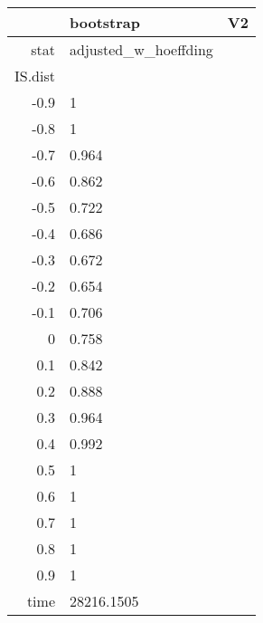 \begin{table}[ht]
\centering
\begingroup\tiny
\begin{tabular}{rll}
  \hline
 & bootstrap & V2 \\ 
  \hline
stat & adjusted\_w\_hoeffding &  \\ 
  IS.dist &  &  \\ 
  -0.9 & 1 &  \\ 
  -0.8 & 1 &  \\ 
  -0.7 & 0.964 &  \\ 
  -0.6 & 0.862 &  \\ 
  -0.5 & 0.722 &  \\ 
  -0.4 & 0.686 &  \\ 
  -0.3 & 0.672 &  \\ 
  -0.2 & 0.654 &  \\ 
  -0.1 & 0.706 &  \\ 
  0 & 0.758 &  \\ 
  0.1 & 0.842 &  \\ 
  0.2 & 0.888 &  \\ 
  0.3 & 0.964 &  \\ 
  0.4 & 0.992 &  \\ 
  0.5 & 1 &  \\ 
  0.6 & 1 &  \\ 
  0.7 & 1 &  \\ 
  0.8 & 1 &  \\ 
  0.9 & 1 &  \\ 
  time & 28216.1505 &  \\ 
   \hline
\end{tabular}
\endgroup
\end{table}
